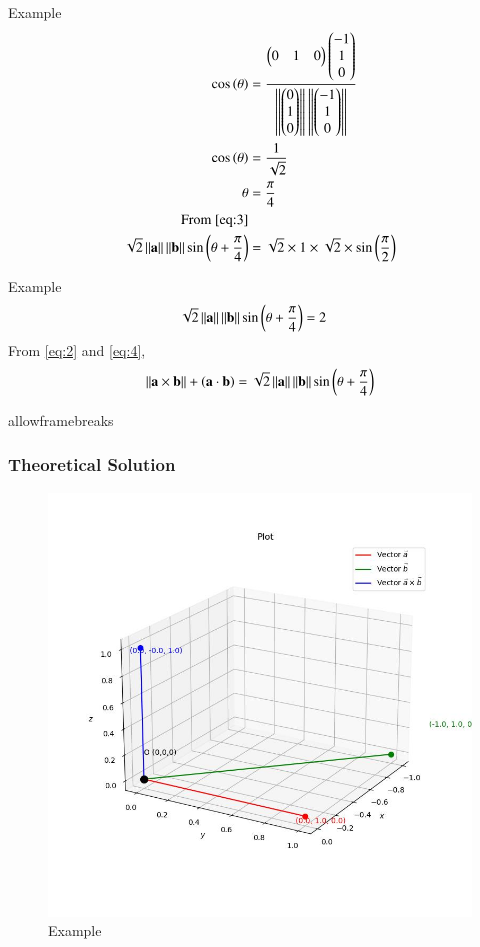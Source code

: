 \documentclass{beamer}
\begin{document}
\begin{frame}{Example}
\begin{align}
    \cos\left(\theta\right) &= \frac{\begin{pmatrix}0 & 1 &  0\end{pmatrix} \begin{pmatrix}-1 \\ 1 \\ 0\end{pmatrix}}{\left\lVert\begin{pmatrix}0 \\ 1 \\  0\end{pmatrix}\right\rVert\left\lVert\begin{pmatrix}-1 \\ 1 \\ 0\end{pmatrix}\right\rVert} \\
    \cos\left(\theta\right) &= \frac{1}{\sqrt{2}} \\
    \theta &= \frac{\pi}{4} \label{eq:3} \\
    \text{From \ref{eq:3}} \\
    \sqrt{2} \left\lVert\mathbf{a}\right\rVert \left\lVert\mathbf{b}\right\rVert \sin\left(\theta + \frac{\pi}{4}\right) &= \sqrt{2} \times 1 \times \sqrt{2} \times \sin\left(\frac{\pi}{2}\right)
\end{align}
\end{frame}

\begin{frame}{Example}
\begin{align}
    \sqrt{2} \left\lVert\mathbf{a}\right\rVert \left\lVert\mathbf{b}\right\rVert \sin\left(\theta + \frac{\pi}{4}\right) &= 2 \label{eq:4}
\end{align}
From \ref{eq:2} and \ref{eq:4},
\begin{align*}
\left\lVert\mathbf{a} \times \mathbf{b}\right\rVert + \left(\mathbf{a} \cdot \mathbf{b}\right) = \sqrt{2} \left\lVert\mathbf{a}\right\rVert \left\lVert\mathbf{b}\right\rVert \sin\left(\theta + \frac{\pi}{4}\right)
\end{align*}
\end{frame}

\begin{frame}{allowframebreaks}
\frametitle{Theoretical Solution}
\begin{figure}
    \centering
    \includegraphics[width=0.5\columnwidth]{../figs/plot_c.jpg}
    \caption{Example}
    \label{fig:fig}
\end{figure}
\end{frame}
\end{document}
